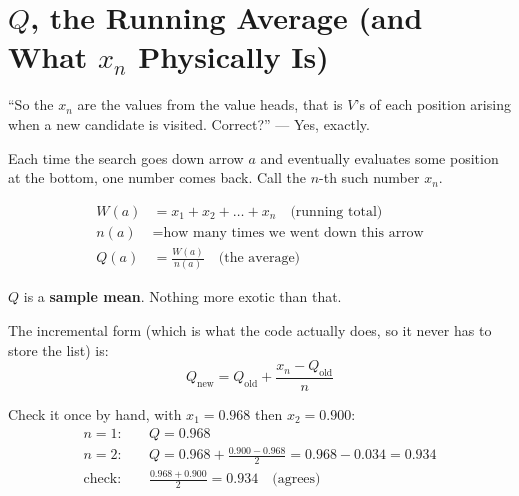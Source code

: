 \chapter{$Q$, the Running Average (and What $x_n$ Physically Is)}
\label{ch:q_average}

\begin{studentq}
``So the $x_n$ are the values from the value heads, that is $V$'s of each position arising when a new candidate is visited. Correct?'' --- Yes, exactly.
\end{studentq}

Each time the search goes down arrow $a$ and eventually evaluates some position at the bottom, one number comes back. Call the $n$-th such number $x_n$.

\begin{align*}
  W(a) &= x_1 + x_2 + \dots + x_n \quad \text{(running total)} \\
  n(a) &= \text{how many times we went down this arrow} \\
  Q(a) &= \frac{W(a)}{n(a)} \quad \text{(the average)}
\end{align*}

$Q$ is a \textbf{sample mean}. Nothing more exotic than that.

The incremental form (which is what the code actually does, so it never has to store the list) is:
\begin{equation}
  Q_{\text{new}} = Q_{\text{old}} + \frac{x_n - Q_{\text{old}}}{n}
\end{equation}

Check it once by hand, with $x_1 = 0.968$ then $x_2 = 0.900$:
\begin{align*}
  n=1: \quad & Q = 0.968 \\
  n=2: \quad & Q = 0.968 + \frac{0.900 - 0.968}{2} = 0.968 - 0.034 = \mathbf{0.934} \\
  \text{check:} \quad & \frac{0.968 + 0.900}{2} = \mathbf{0.934} \quad \text{(agrees)}
\end{align*}

\begin{center}
\begin{minipage}{\linewidth}
\centering

\label{fig:qmean}
\end{minipage}
\end{center}

